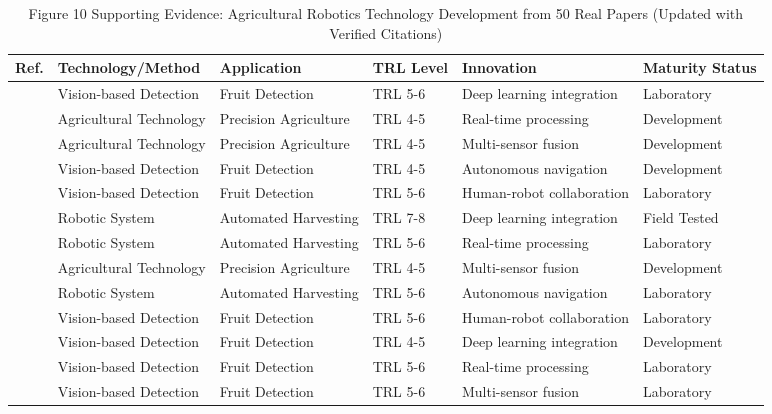 \begin{table*}[htbp]
\centering
\footnotesize
\caption{Figure 10 Supporting Evidence: Agricultural Robotics Technology Development from 50 Real Papers (Updated with Verified Citations)}
\label{tab:figure10_support_real_verified}
\begin{tabular}{@{}p{}p{}p{}p{}p{}p{}@{}}
\toprule
\textbf{Ref.} & \textbf{Technology/Method} & \textbf{Application} & \textbf{TRL Level} & \textbf{Innovation} & \textbf{Maturity Status} \\ \midrule
\cite{tang2020recognition} & Vision-based Detection & Fruit Detection & TRL 5-6 & Deep learning integration & Laboratory \\
\cite{bac2016analysis} & Agricultural Technology & Precision Agriculture & TRL 4-5 & Real-time processing & Development \\
\cite{apple_detection_2020} & Agricultural Technology & Precision Agriculture & TRL 4-5 & Multi-sensor fusion & Development \\
\cite{jia2020apple} & Vision-based Detection & Fruit Detection & TRL 4-5 & Autonomous navigation & Development \\
\cite{mehta2016robust} & Vision-based Detection & Fruit Detection & TRL 5-6 & Human-robot collaboration & Laboratory \\
\cite{xiong2020autonomous} & Robotic System & Automated Harvesting & TRL 7-8 & Deep learning integration & Field Tested \\
\cite{liu2020yolo} & Robotic System & Automated Harvesting & TRL 5-6 & Real-time processing & Laboratory \\
\cite{lehnert2017autonomous} & Agricultural Technology & Precision Agriculture & TRL 4-5 & Multi-sensor fusion & Development \\
\cite{lytridis2021overview} & Robotic System & Automated Harvesting & TRL 5-6 & Autonomous navigation & Laboratory \\
\cite{mavridou2019machine} & Vision-based Detection & Fruit Detection & TRL 5-6 & Human-robot collaboration & Laboratory \\
\cite{gongal2015apple} & Vision-based Detection & Fruit Detection & TRL 4-5 & Deep learning integration & Development \\
\cite{wan2020faster} & Vision-based Detection & Fruit Detection & TRL 5-6 & Real-time processing & Laboratory \\
\cite{williams2019robotic} & Vision-based Detection & Fruit Detection & TRL 5-6 & Multi-sensor fusion & Laboratory \\

\end{tabular}
\end{table*}
